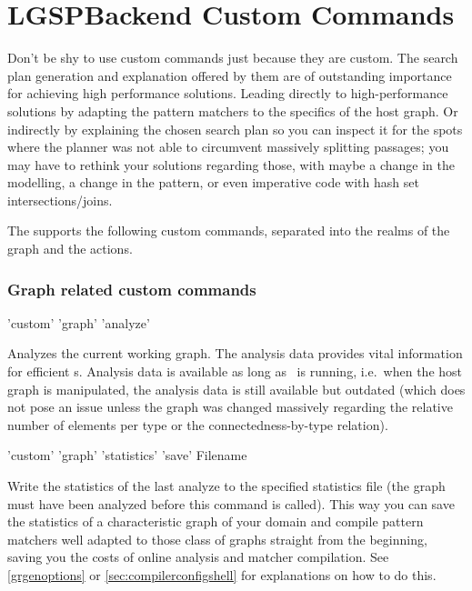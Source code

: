 \section{LGSPBackend Custom Commands}
\label{custom}


Don't be shy to use custom commands just because they are custom.
The search plan generation and explanation offered by them are of outstanding importance for achieving high performance solutions.
Leading directly to high-performance solutions by adapting the pattern matchers to the specifics of the host graph.
Or indirectly by explaining the chosen search plan so you can inspect it for the spots where the planner was not able to circumvent massively splitting passages; you may have to rethink your solutions regarding those, with maybe a change in the modelling, a change in the pattern, or even imperative code with hash set intersections/joins.

The  supports the following custom commands, separated into the realms of the graph and the actions.

\subsubsection*{Graph related custom commands}

\begin{rail}
  'custom' 'graph' 'analyze'
\end{rail}
Analyzes the current working graph.
The analysis data provides vital information for efficient s.
Analysis data is available as long as \GrShell\ is running, i.e.\ when the host graph is manipulated, the analysis data is still available but outdated (which does not pose an issue unless the graph was changed massively regarding the relative number of elements per type or the connectedness-by-type relation).

\begin{rail}
  'custom' 'graph' 'statistics' 'save' Filename
\end{rail}
Write the statistics of the last analyze to the specified statistics file (the graph must have been analyzed before this command is called).
This way you can save the statistics of a characteristic graph of your domain and compile pattern matchers well adapted to those class of graphs straight from the beginning, saving you the costs of online analysis and matcher compilation.
See \ref{grgenoptions} or \ref{sec:compilerconfigshell} for explanations on how to do this.

